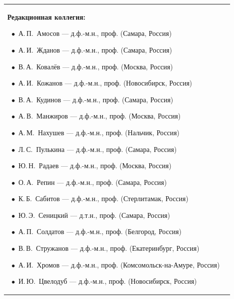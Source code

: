 \begin{table}[t!]
\begin{center}
\begin{tabular}{p{7cm}p{6cm}}
{\textbf{Редакционная коллегия:}
\par 
$~~\bullet$ А.\,П.~Амосов --- д.ф.-м.н., проф. (Самара, Россия) \par 
$~~\bullet$ А.\,И.~Жданов --- д.ф.-м.н., проф.  (Самара, Россия) \par 
$~~\bullet$ В.\,А.~Ковалёв --- д.ф.-м.н., проф. (Москва, Россия) \par
$~~\bullet$ А.\,И.~Кожанов --- д.ф.-м.н., проф. (Новосибирск, Россия) \par 
$~~\bullet$ В.\,А.~Кудинов --- д.ф.-м.н., проф. (Самара, Россия) \par 
$~~\bullet$ А.\,В.~Манжиров --- д.ф.-м.н., проф. (Москва, Россия) \par
$~~\bullet$ А.\,М.~Нахушев --- д.ф.-м.н., проф. (Нальчик, Россия) \par
$~~\bullet$ Л.\,С.~Пулькина --- д.ф.-м.н., проф. (Самара, Россия) \par 
$~~\bullet$ Ю.\,Н.~Радаев --- д.ф.-м.н., проф. (Москва, Россия) \par
$~~\bullet$ О.\,А.~Репин --- д.ф.-м.н., проф. (Самара, Россия)\par 
$~~\bullet$ К.\,Б.~Сабитов --- д.ф.-м.н., проф. (Стерлитамак, Россия)\par 
$~~\bullet$ Ю.\,Э.~Сеницкий --- д.т.н., проф. (Самара, Россия) \par 
$~~\bullet$ А.\,П.~Солдатов --- д.ф.-м.н., проф. (Белгород, Россия) \par
$~~\bullet$ В.\,В.~Стружанов --- д.ф.-м.н., проф. (Екатеринбург, Россия) \par 
$~~\bullet$ А.\,И.~Хромов --- д.ф.-м.н., проф. (Комсомольск-на-Амуре, Россия)\par
$~~\bullet$ И.\,Ю.~Цвелодуб --- д.ф.-м.н., проф. (Новосибирск, Россия)  \par
\smallskip \par
}  \\
\end{tabular}
\footnotesize


\vspace{-1cm}

\end{center}
\end{table}


